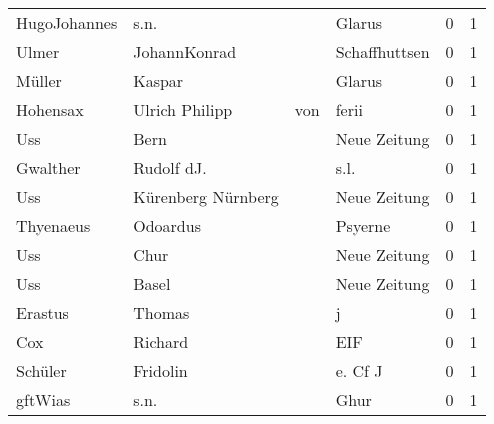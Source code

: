 \documentclass[10pt,a4paper,landscape]{article}
\begin{document}
\begin{longtable}{llllrr}
             HugoJohannes &                               s.n. &             &                                      Glarus &          0 &         1 \\
                    Ulmer &                       JohannKonrad &             &                               Schaffhuttsen &          0 &         1 \\
                   Müller &                             Kaspar &             &                                      Glarus &          0 &         1 \\
                 Hohensax &                     Ulrich Philipp &         von &                                       ferii &          0 &         1 \\
                      Uss &                               Bern &             &                                Neue Zeitung &          0 &         1 \\
                 Gwalther &                         Rudolf dJ. &             &                                        s.l. &          0 &         1 \\
                      Uss &                 Kürenberg Nürnberg &             &                                Neue Zeitung &          0 &         1 \\
                Thyenaeus &                           Odoardus &             &                                     Psyerne &          0 &         1 \\
                      Uss &                               Chur &             &                                Neue Zeitung &          0 &         1 \\
                      Uss &                              Basel &             &                                Neue Zeitung &          0 &         1 \\
                  Erastus &                             Thomas &             &                                           j &          0 &         1 \\
                      Cox &                            Richard &             &                                         EIF &          0 &         1 \\
                  Schüler &                           Fridolin &             &                                     e. Cf J &          0 &         1 \\
                  gftWias &                               s.n. &             &                                        Ghur &          0 &         1 \\

\end{longtable}
\end{document}
